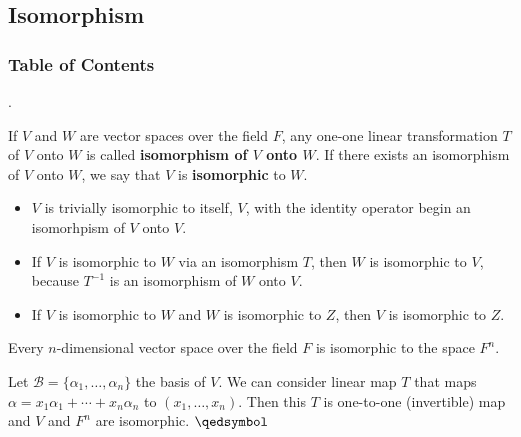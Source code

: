 \documentclass[8pt]{beamer}
\newcommand{\mc}[1]{\mathcal{#1}}
\newcommand{\tb}[1]{\textbf{#1}}
\begin{document}
\subsection{Isomorphism}
\begingroup
    \begin{frame}
        \frametitle{Table of Contents}
        \tableofcontents[currentsubsection]
    \end{frame}
\endgroup

\begin{frame}{.}
    \begin{definition}
        If $V$ and $W$ are vector spaces over the field $F$, any one-one linear transformation $T$ of $V$ onto $W$ is called \tb{isomorphism of $V$ onto $W$}.
        If there exists an isomorphism of $V$ onto $W$, we say that $V$ is \tb{isomorphic} to $W$.
    \end{definition}
    \begin{itemize}
        \item $V$ is trivially isomorphic to itself, $V$, with the identity operator begin an isomorhpism of $V$ onto $V$.
        \item If $V$ is isomorphic to $W$ via an isomorphism $T$, then $W$ is isomorphic to $V$, because $T^{-1}$ is an isomorphism of $W$ onto $V$.
        \item If $V$ is isomorphic to $W$ and $W$ is isomorphic to $Z$, then $V$ is isomorphic to $Z$.
    \end{itemize}
    \begin{theorem}
        Every $n$-dimensional vector space over the field $F$ is isomorphic to the space $F^n$.
    \end{theorem}

    Let $\mc{B} = \{\alpha_1, \dots, \alpha_n\}$ the basis of $V$.
    We can consider linear map $T$ that maps $\alpha =x_1 \alpha_1 + \cdots + x_n \alpha_n $ to $(x_1, \dots, x_n)$.
    Then this $T$ is one-to-one (invertible) map and $V$ and $F^n$ are isomorphic.
    $\qedsymbol$
\end{frame}
\end{document}

